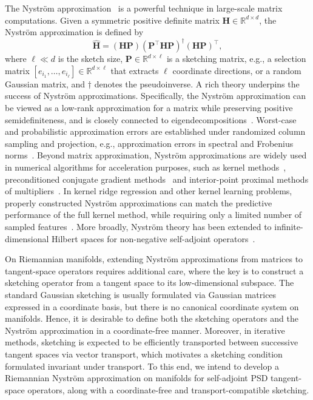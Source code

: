 \documentclass[final,onefignum,onetabnum]{siamart250211}
\begin{document}
The Nystr\"om approximation~\cite{GittensMahoney2016, martinsson2020randomized} is a powerful technique in large-scale matrix computations.
Given a symmetric positive definite matrix $\mathbf{H}\in\mathbb R^{d\times d}$, the Nystr\"om approximation is defined by 
\begin{equation}
    \label{eq:Euclidean-nystrom}
\widehat{\mathbf{H}} = (\mathbf{H} \mathbf{P}) (\mathbf{P}^\top \mathbf{H} \mathbf{P})^{\dagger} (\mathbf{H} \mathbf{P})^\top,
\end{equation}
where $\ell \ll d$ is the sketch size, $\mathbf{P} \in \mathbb{R}^{d \times \ell}$ is a sketching matrix, e.g., a selection matrix $[e_{i_1},\dots,e_{i_\ell}]\in\mathbb R^{d\times \ell}$ that extracts \(\ell\) coordinate directions, or a random Gaussian matrix, and $\dagger$ denotes the pseudoinverse. A rich theory underpins the success of Nystr\"om approximations. Specifically, the Nystr\"om approximation can be viewed as a low-rank approximation for a matrix while preserving positive semidefiniteness, and is closely connected to eigendecompositions~\cite{martinsson2020randomized}.
Worst-case and probabilistic approximation errors are established under randomized column sampling and projection, e.g., approximation errors in spectral and Frobenius norms~\cite{ZhangTsangKwok2008, Gittens2011,GittensMahoney2016}. 
Beyond matrix approximation, Nystr\"om approximations are widely used in numerical algorithms for acceleration purposes, such as kernel methods~\cite{WilliamsSeeger2001,DrineasMahoney2005,bucci2025numerical}, preconditioned conjugate gradient methods~\cite{Frangella2023} and interior-point proximal methods of multipliers~\cite{chu2026randomized}.
In kernel ridge regression and other kernel learning problems, properly constructed Nystr\"om approximations can match the predictive performance of the full kernel method, while requiring only a limited number of sampled features~\cite{Bach2013,AlaouiMahoney2015}.
More broadly, Nystr\"om theory has been extended to infinite-dimensional Hilbert spaces for non-negative self-adjoint operators~\cite{PerssonBoulleKressner2024}.


On Riemannian manifolds, extending Nystr\"om approximations from matrices to tangent-space operators requires additional care, where the key is to construct a sketching operator from a tangent space to its low-dimensional subspace. The standard Gaussian sketching is usually formulated via Gaussian matrices expressed in a coordinate basis, but there is no canonical coordinate system on manifolds. Hence, 
it is desirable to define both the sketching operators and the Nystr\"om approximation in a coordinate-free manner.
Moreover, in iterative methods, sketching is expected to be efficiently transported between successive tangent spaces via vector transport, which motivates a sketching condition formulated invariant under transport.
To this end, we intend to develop a Riemannian Nystr\"om approximation on manifolds for self-adjoint PSD tangent-space operators, along with a coordinate-free and transport-compatible sketching.
\end{document}
